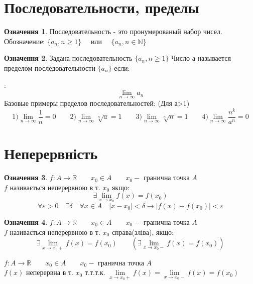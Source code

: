 \documentclass[14pt,a4paper]{scrartcl}
\theoremstyle{definition}
\newtheorem{defo}{Означення}[section]
\theoremstyle{remark}
\theoremstyle{definition}
\theoremstyle{definition}
\begin{document}
\section{Последовательности, пределы}
\begin{defo}
Последовательность - это пронумерованый набор чисел. \\ Обозначение: $\lbrace a_n, n \geq 1\rbrace \quad$ или $\quad\lbrace a_n, n \in \mathbb{N}\rbrace$
\end{defo}
\begin{defo}
Задана последовательность $\lbrace a_n, n \geq 1\rbrace$
Число а называется пределом последовательности $\lbrace a_n\rbrace$ если:
\noindent{}
\end{defo}
:$$\lim_{n\to\infty}{a_n}$$
Базовые примеры пределов последовательностей: (Для а>1)\\
$$
1) \lim_{n\to\infty}{\frac{1}{n}} = 0 \qquad
2) \lim_{n\to\infty}{\sqrt[n]{a}} = 1 \qquad
3) \lim_{n\to\infty}{\sqrt[n]{n}} = 1 \qquad
4) \lim_{n\to\infty}{\frac{n^k}{a^n}} = 0
$$
\pagebreak

\section{Неперервність}

\begin{defo}
  $f: A \to \mathbb{R} \qquad x_0 \in A \qquad x_0 -$ гранична точка $A$\\
  $f$ називається неперервною в т. $x_0$ якщо:
  $$\exists  \lim\limits_{x\to x_0}{f(x)} = f(x_0)$$
  $$\forall \varepsilon >0 \quad \exists \delta \quad \forall x \in A \quad |x - x_0|<\delta \rightarrow |f(x) - f(x_0)|<\varepsilon $$
\end{defo}

\begin{defo}
$f: A \to \mathbb{R} \qquad x_0 \in A \qquad x_0 -$ гранична точка $A$\\
$f$ називається неперервною в т. $x_0$ справа(зліва), якщо:
$$\exists  \lim\limits_{x\to x_0+}{f(x)} = f(x_0) \qquad
(\exists  \lim\limits_{x\to x_0 -}{f(x)} = f(x_0))$$
\end{defo}

\begin{boxteo}
$f: A \to \mathbb{R} \qquad x_0 \in A \qquad x_0 -$ гранична точка $A$\\
$f(x)$ неперервна в т. $x_0$ т.т.т.к. \quad
$\lim\limits_{x\to x_0+}{f(x)} =  \lim\limits_{x\to x_0 -}{f(x)} = f(x_0) $
\end{boxteo}
\end{document}
